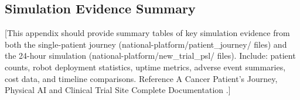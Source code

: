 \newpage

\subsection{Simulation Evidence Summary}
\label{app:simulation}

[This appendix should provide summary tables of key simulation evidence from
both the single-patient journey (national-platform/patient\_journey/ files)
and the 24-hour simulation (national-platform/new\_trial\_psl/ files).
Include: patient counts, robot deployment statistics, uptime metrics, adverse
event summaries, cost data, and timeline comparisons. Reference A Cancer
Patient's Journey, Physical AI \cite{patient-journey-paper} and Clinical Trial
Site Complete Documentation \cite{site-docs}.]
